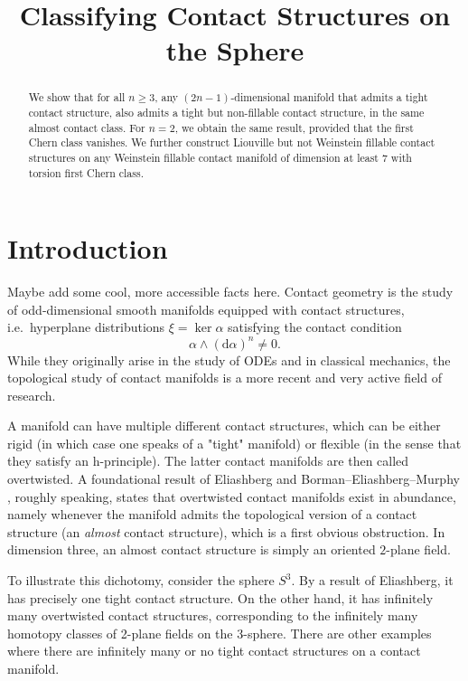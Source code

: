 \documentclass{amsart}
\renewcommand*{\d}{\mathrm{d}}
\begin{document}
\title{Classifying Contact Structures on the Sphere}
\address{}
\date{}

\begin{abstract}
We show that for all $n \ge 3$, any $(2n -1)$-dimensional manifold that admits a tight contact
structure, also admits a tight but non-fillable contact structure, in the same almost contact class.
For $n = 2$, we obtain the same result, provided that the first Chern class vanishes. 
We further construct Liouville but not Weinstein fillable contact structures on any Weinstein fillable contact manifold of dimension at least 7 with torsion first Chern class.
\end{abstract}

\maketitle
\section*{Introduction}
Maybe add some cool, more accessible facts here.
Contact geometry is the study of odd-dimensional smooth manifolds equipped with contact structures, i.e.\ hyperplane distributions $\xi = \ker \alpha$ satisfying the contact condition
\[
    \alpha \wedge (\d \alpha)^n \neq 0.
\]
While they originally arise in the study of ODEs and in classical mechanics, the topological study of contact manifolds is a more recent and very active field of research.

A manifold can have multiple different contact structures, which can be either rigid (in which case one speaks of a "tight" manifold) or flexible (in the sense that they satisfy an h-principle). The latter contact manifolds are then called overtwisted. A foundational result of Eliashberg \cite{Eliashberg89} and Borman--Eliashberg--Murphy \cite{BEM15}, roughly speaking, states that overtwisted contact manifolds exist in abundance, namely whenever the manifold admits the topological version of a contact structure (an \emph{almost} contact structure), which is a first obvious obstruction. In dimension three, an almost contact structure is simply an oriented $2$-plane field.

To illustrate this dichotomy, consider the sphere $S^3$. By a result of Eliashberg, it has precisely one tight contact structure. On the other hand, it has infinitely many overtwisted contact structures, corresponding to the infinitely many homotopy classes of 2-plane fields on the 3-sphere. There are other examples where there are infinitely many or no tight contact structures on a contact manifold.
\end{document}
